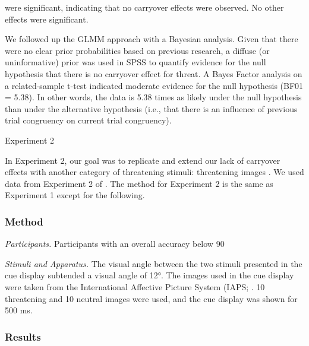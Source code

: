 \documentclass{article}
\begin{document}
were significant, indicating that no carryover effects were observed. No other effects were significant.



	We followed up the GLMM approach with a Bayesian analysis. Given that there were no clear prior probabilities based on previous research, a diffuse (or uninformative) prior was used in SPSS to quantify evidence for the null hypothesis that there is no carryover effect for threat. A Bayes Factor analysis on a related-sample t-test indicated moderate evidence for the null hypothesis (BF01 = 5.38). In other words, the data is 5.38 times as likely under the null hypothesis than under the alternative hypothesis (i.e., that there is an influence of previous trial congruency on current trial congruency).



	Experiment 2



	In Experiment 2, our goal was to replicate and extend our lack of carryover effects with another category of threatening stimuli: threatening images \autocite{Lang2008}. We used data from Experiment 2 of \autocite{Carlson2020}. The method for Experiment 2 is the same as Experiment 1 except for the following.



	\subsubsection{Method}



	\emph{Participants. }Participants with an overall accuracy below 90%



	\emph{Stimuli and Apparatus. }The visual angle between the two stimuli presented in the cue display subtended a visual angle of 12°. The images used in the cue display were taken from the International Affective Picture System (IAPS; \autocite{Lang2008}. 10 threatening and 10 neutral images were used, and the cue display was shown for 500 ms.



	\subsubsection{Results}
\end{document}
